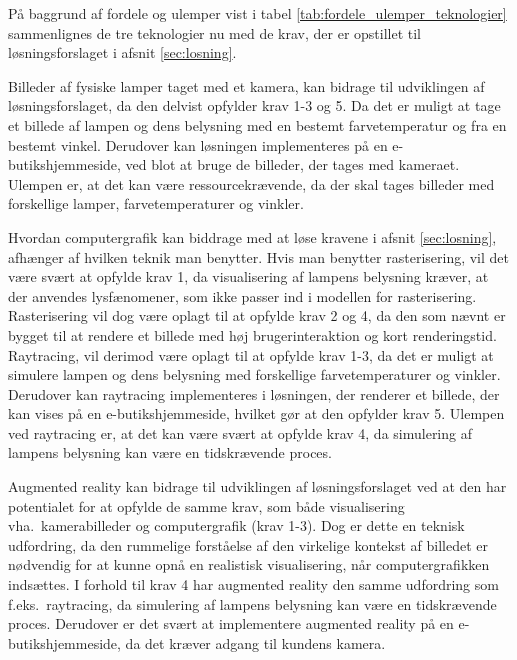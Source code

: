 På baggrund af fordele og ulemper vist i tabel \ref{tab:fordele_ulemper_teknologier} sammenlignes de tre teknologier nu med de krav, der er opstillet til løsningsforslaget i afsnit \ref{sec:losning}. 

Billeder af fysiske lamper taget med et kamera, kan bidrage til udviklingen af løsningsforslaget, da den delvist opfylder krav 1-3 og 5. Da det er muligt at tage et billede af lampen og dens belysning med en bestemt farvetemperatur og fra en bestemt vinkel. Derudover kan løsningen implementeres på en e-butikshjemmeside, ved blot at bruge de billeder, der tages med kameraet. Ulempen er, at det kan være ressourcekrævende, da der skal tages billeder med forskellige lamper, farvetemperaturer og vinkler.

Hvordan computergrafik kan biddrage med at løse kravene i afsnit \ref{sec:losning}, afhænger af hvilken teknik man benytter. Hvis man benytter rasterisering, vil det være svært at opfylde krav 1, da visualisering af lampens belysning kræver, at der anvendes lysfænomener, som ikke passer ind i modellen for rasterisering. Rasterisering vil dog være oplagt til at opfylde krav 2 og 4, da den som nævnt er bygget til at rendere et billede med høj brugerinteraktion og kort renderingstid.
Raytracing, vil derimod være oplagt til at opfylde krav 1-3, da det er muligt at simulere lampen og dens belysning med forskellige farvetemperaturer og vinkler. Derudover kan raytracing implementeres i løsningen, der renderer et billede, der kan vises på en e-butikshjemmeside, hvilket gør at den opfylder krav 5. Ulempen ved raytracing er, at det kan være svært at opfylde krav 4, da simulering af lampens belysning kan være en tidskrævende proces.

Augmented reality kan bidrage til udviklingen af løsningsforslaget ved at den har potentialet for at opfylde de samme krav, som både visualisering vha.\ kamerabilleder og computergrafik (krav 1-3). Dog er dette en teknisk udfordring, da den rummelige forståelse af den virkelige kontekst af billedet er nødvendig for at kunne opnå en realistisk visualisering, når computergrafikken indsættes. I forhold til krav 4 har augmented reality den samme udfordring som f.eks.\ raytracing, da simulering af lampens belysning kan være en tidskrævende proces. Derudover er det svært at implementere augmented reality på en e-butikshjemmeside, da det kræver adgang til kundens kamera. 



\clearpage

